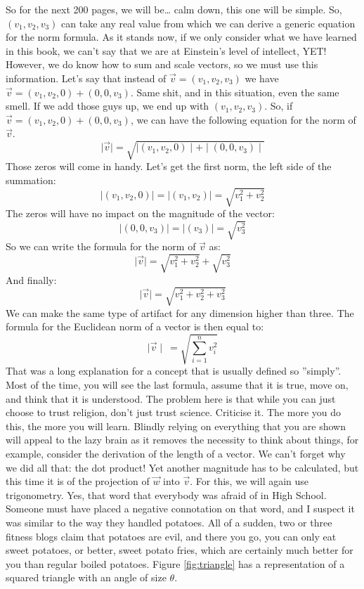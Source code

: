 \documentclass[600paper, 11pt,twoside,openany]{kdp}
\begin{document}
\par 
\vspace{-3pt}
\indent So for the next 200 pages, we will be… calm down, this one will be simple. So, $(v_1,v_2,v_3)$ can take any real value from which we can derive a generic equation for the norm formula. As it stands now, if we only consider what we have learned in this book, we can’t say that we are at Einstein’s level of intellect, YET! However, we do know how to sum and scale vectors, so we must use this information. Let’s say that instead of $\overrightarrow{v} = (v_1,v_2,v_3)$  we have $\overrightarrow{v} = (v_1,v_2,0) + (0,0,v_3)$. Same shit, and in this situation, even the same smell. If we add those guys up, we end up with $(v_1,v_2,v_3)$. So, if $\overrightarrow{v} = (v_1,v_2,0) + (0,0,v_3)$, we can have the following equation for the norm of $\overrightarrow{v}$.
\[\mid \overrightarrow{v} \mid = \sqrt{\mid(v_1,v_2,0)\mid + \mid(0,0,v_3)\mid}\]
\indent Those zeros will come in handy. Let’s get the first norm, the left side of the summation:
\[\mid(v_1,v_2,0)\mid = \mid(v_1,v_2)\mid  = \sqrt{v_1^{2} + v_2^{2}} \]
\indent The zeros will have no impact on the magnitude of the vector:
\[ \mid(0,0,v_3)\mid =  \mid(v_3)\mid = \sqrt{v_3^{2}} \]
\indent So we can write the formula for the norm of $\overrightarrow{v}$ as:
\[\mid \overrightarrow{v}\mid =  \sqrt{v_1^{2} + v_2^{2}} + \sqrt{v_3^{2}}\]
\indent And finally:
\[\mid \overrightarrow{v}\mid =  \sqrt{v_1^{2} + v_2^{2} + v_3^{2}}\]
\indent We can make the same type of artifact for any dimension higher than three. The formula for the Euclidean norm of a vector is then equal to:
\[\mid \overrightarrow{v} \mid\  =  \sqrt{\sum_{i=1}^{n} v_i^{2}}\]
\indent That was a long explanation for a concept that is usually defined so ”simply”. Most of the time, you will see the last formula, assume that it is true, move on, and think that it is understood. The problem here is that while you can just choose to trust religion, don’t just trust science. Criticise it. The more you do this, the more you will learn. Blindly relying on everything that you are shown will appeal to the lazy brain as it removes the necessity to think about things, for example, consider the derivation of the length of a vector. We can’t forget why we did all that: the dot product! Yet another magnitude has to be calculated, but this time it is of the projection of $\overrightarrow{w}$ into $\overrightarrow{v}$. For this, we will again use trigonometry. Yes, that word that everybody was afraid of in High School. Someone must have placed a negative connotation on that word, and I suspect it was similar to the way they handled potatoes. All of a sudden, two or three fitness blogs claim that potatoes are evil, and there you go, you can only eat sweet potatoes, or better, sweet potato fries, which are certainly much better for you than regular boiled potatoes. Figure \ref{fig:triangle} has a representation of a squared triangle with an angle of size $\theta$. 
\end{document}
